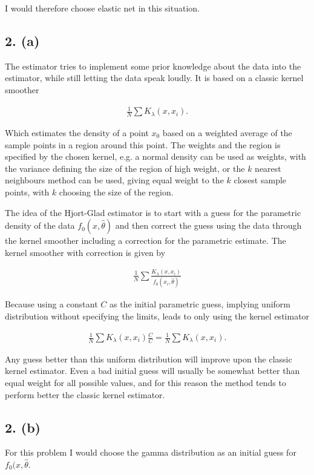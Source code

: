 \documentclass[a4paper, 10pt, english]{article}
\begin{document}
I would therefore choose elastic net in this situation.


\subsection{2. (a)}

The estimator tries to implement some prior knowledge about the data into the estimator, while still letting
the data speak loudly.
It is based on a classic kernel smoother

\begin{align*}
    \frac{1}{N}\sum K_\lambda(x, x_i).
\end{align*}

Which estimates the density of a point $x_0$ based on a weighted average of the sample points in a region
around this point. The weights and the region is specified by the chosen kernel, e.g. a normal density can be
used as weights, with the variance defining the size of the region of high weight, or the $k$ nearest neighbours
method can be used, giving equal weight to the $k$ closest sample points, with $k$ choosing the size of the
region.


The idea of the Hjort-Glad estimator is to start with a guess for the parametric density of the data $f_{0}(x, \hat{\theta})$ and then
correct the guess using the data through the kernel smoother including a correction for the parametric
estimate. The kernel smoother with correction is given by

\begin{align*}
    \frac{1}{N}\sum
    \frac{K_\lambda(x, x_i)}{f_0(x_i, \hat{\theta})}
\end{align*}

Because using a constant $C$ as the initial parametric guess, implying uniform distribution without specifying the
limits, leads to only using the kernel estimator

\begin{align*}
    \frac{1}{N}\sum
    K_\lambda(x, x_i)
    \frac{C}{C}
    =
    \frac{1}{N}\sum
    K_\lambda(x, x_i).
\end{align*}

Any guess better than this uniform distribution will improve upon the classic kernel estimator. Even a bad initial
guess will usually be somewhat better than equal weight for all possible values, and for this reason the method
tends to perform better the classic kernel estimator.

\subsection{2. (b)}
For this problem I would choose the gamma distribution as an initial guess for $f_0(x, \hat{\theta}$.
\end{document}
